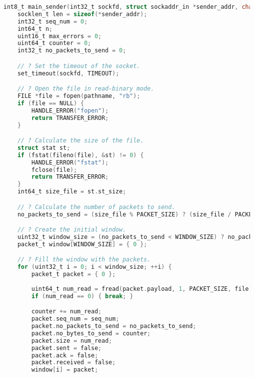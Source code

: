 \begin{lstlisting}[caption={\lstinlinebg{src/protocol.c}},language=C,keywords={TIMEOUT, fopen, for, fread, PACKET_SIZE, break, ifdef, endif, IS_CLIENT, timeval, gettimeofday, send_data_to_receiver, wait_ack, while, true, ack_packet_t, recvfrom, WRITE_BYTE_ERROR, MAX_ERRORS, double, SPQR_KB, FILE_TRANSFER_FAILED, EXIT_SUCCESS, FILE_TRANSFER_COMPLETED, printf, sendto, SEQ_NUM_ERROR, sizeof, int8_t, int32_t, uint16_t, int64_t, struct, sockaddr, sockaddr_in, char, socklen_t, uint32_t, uint64_t, WINDOW_SIZE, stat, fstat, fileno, set_timeout, FILE, NULL, HANDLE_ERROR, return, TRANSFER_ERROR, if, else, perror, exit, fprintf, stderr, MAX_RETRIES, spqr_assert, spqr_free, fclose, free, spqr_assert_ptr, fseek, SEEK_END, ftell, rewind, malloc, memset, sizeof, packet_t, MAX_READ_LINE, MAX_WINDOW_SIZE, MAX_PACKETS, MAX_ACKS}]
int8_t main_sender(int32_t sockfd, struct sockaddr_in *sender_addr, char *pathname) {
    socklen_t len = sizeof(*sender_addr);
    int32_t seq_num = 0;
    int64_t n;
    uint16_t max_errors = 0;
    uint64_t counter = 0;
    int32_t no_packets_to_send = 0;

    // ? Set the timeout of the socket.
    set_timeout(sockfd, TIMEOUT);

    // ? Open the file in read-binary mode.
    FILE *file = fopen(pathname, "rb");
    if (file == NULL) {
        HANDLE_ERROR("fopen");
        return TRANSFER_ERROR;
    }

    // ? Calculate the size of the file.
    struct stat st;
    if (fstat(fileno(file), &st) != 0) {
        HANDLE_ERROR("fstat");
        fclose(file);
        return TRANSFER_ERROR;
    }
    int64_t size_file = st.st_size;

    // ? Calculate the number of packets to send.
    no_packets_to_send = (size_file % PACKET_SIZE) ? (size_file / PACKET_SIZE) + 1 : size_file / PACKET_SIZE;

    // ? Create the initial window.
    uint32_t window_size = (no_packets_to_send < WINDOW_SIZE) ? no_packets_to_send : WINDOW_SIZE;
    packet_t window[WINDOW_SIZE] = { 0 };

    // ? Fill the window with the packets.
    for (uint32_t i = 0; i < window_size; ++i) {
        packet_t packet = { 0 };
        
        uint64_t num_read = fread(packet.payload, 1, PACKET_SIZE, file);
        if (num_read == 0) { break; }

        counter += num_read;
        packet.seq_num = seq_num;
        packet.no_packets_to_send = no_packets_to_send;
        packet.no_bytes_to_send = counter;
        packet.size = num_read;
        packet.sent = false;
        packet.ack = false;
        packet.received = false;
        window[i] = packet;


\end{lstlisting}
